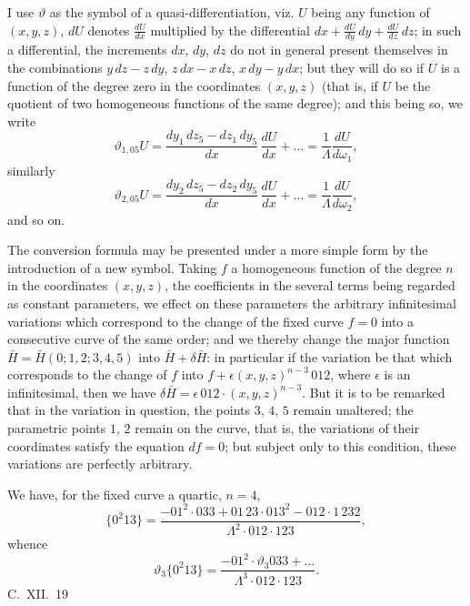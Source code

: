\documentclass[11pt,a4paper]{book}
\begin{document}
\begin{art}\label{art:60}
I use $\vartheta$ as the symbol of a quasi-differentiation, viz. $U$ being any function of $(x, y, z)$, $dU$ denotes $\frac{dU}{dx}$ multiplied by the differential $dx + \frac{dU}{dy}\,dy + \frac{dU}{dz}\,dz$; in such a differential, the increments $dx$, $dy$, $dz$ do not in general present themselves in the combinations $y\,dz - z\,dy$, $z\,dx - x\,dz$, $x\,dy - y\,dx$; but they will do so if $U$ is a function of the degree zero in the coordinates $(x, y, z)$ (that is, if $U$ be the quotient of two homogeneous functions of the same degree); and this being so, we write
\[
\vartheta_{1,05} U = \frac{dy_1\,dz_5 - dz_1\,dy_5}{dx}\,\frac{dU}{dx} + \ldots = \frac{1}{\Lambda}\frac{dU}{d\omega_1},
\]
similarly
\[
\vartheta_{2,05} U = \frac{dy_2\,dz_5 - dz_2\,dy_5}{dx}\,\frac{dU}{dx} + \ldots = \frac{1}{\Lambda}\frac{dU}{d\omega_2},
\]
and so on.
\end{art}

\begin{art}\label{art:61}
The conversion formula may be presented under a more simple form by the introduction of a new symbol. Taking $f$ a homogeneous function of the degree $n$ in the coordinates $(x, y, z)$, the coefficients in the several terms being regarded as constant parameters, we effect on these parameters the arbitrary infinitesimal variations which correspond to the change of the fixed curve $f = 0$ into a consecutive curve of the same order; and we thereby change the major function $\bar{H} = \bar{H}(0; 1, 2; 3, 4, 5)$ into $\bar{H} + \delta\bar{H}$: in particular if the variation be that which corresponds to the change of $f$ into $f + \epsilon(x, y, z)^{n-3}\,012$, where $\epsilon$ is an infinitesimal, then we have $\delta\bar{H} = \epsilon\,012 \cdot (x, y, z)^{n-3}$. But it is to be remarked that in the variation in question, the points $3$, $4$, $5$ remain unaltered; the parametric points $1$, $2$ remain on the curve, that is, the variations of their coordinates satisfy the equation $df = 0$; but subject only to this condition, these variations are perfectly arbitrary.
\end{art}

\begin{art}\label{art:62}
We have, for the fixed curve a quartic, $n = 4$,
\[
\{0^2 13\} = \frac{-01^2 \cdot 033 + 01\,23 \cdot 013^2 - 012 \cdot 1\,232}{\Lambda^2 \cdot 012 \cdot 123},
\]
whence
\[
\vartheta_3\{0^2 13\} = \frac{-01^2 \cdot \vartheta_3 033 + \ldots}{\Lambda^3 \cdot 012 \cdot 123}.
\]
C.~XII.~19
\end{art}
\end{document}
